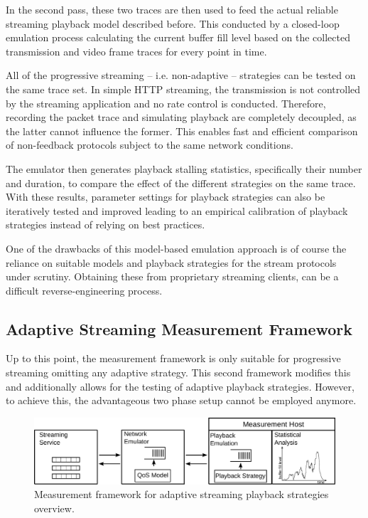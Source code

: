 In the second pass, these two traces are then used to feed the actual reliable streaming playback model described before. This conducted by a closed-loop emulation process calculating the current buffer fill level based on the collected transmission and video frame traces for every point in time. 

All of the progressive streaming -- i.e. non-adaptive -- strategies can be tested on the same trace set.
In simple \gls{HTTP} streaming, the transmission is not controlled by the streaming application and no rate control is conducted. Therefore, recording the packet trace and simulating playback are completely decoupled, as the latter cannot influence the former.  This enables fast and efficient comparison of non-feedback protocols subject to the same network conditions.

The emulator then generates playback stalling statistics, specifically their number and duration, to compare the effect of the different strategies on the same trace. With these results, parameter settings for playback strategies can also be iteratively tested and improved leading to an empirical calibration of playback strategies instead of relying on best practices.

One of the drawbacks of this model-based emulation approach is of course the reliance on suitable models and playback strategies for the stream protocols under scrutiny. Obtaining these from proprietary streaming clients, can be a difficult reverse-engineering process.


\subsection{Adaptive Streaming Measurement Framework}

Up to this point, the measurement framework is only suitable for progressive streaming omitting any adaptive strategy. This second framework modifies this and additionally allows for the testing of adaptive playback strategies. However, to achieve this, the advantageous two phase setup cannot be employed anymore.

\begin{figure}[htb]
    \includegraphics[width=\textwidth]{images/feedback-measurement-model.pdf}
    \caption{Measurement framework for adaptive streaming playback strategies overview.}
    \label{c3:fig:framework-feedback}
\end{figure}

